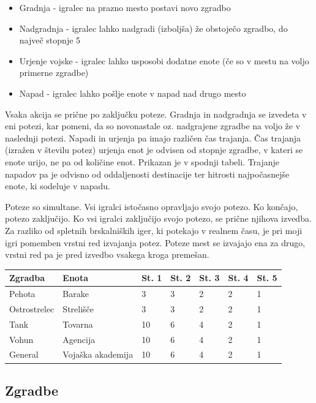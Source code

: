 \documentclass[a4paper, 16pt]{article}
\begin{document}
\begin{itemize}
    \item Gradnja - igralec na prazno mesto postavi novo zgradbo
    \item Nadgradnja - igralec lahko nadgradi (izboljša) že obstoječo zgradbo, do največ stopnje 5
    \item Urjenje vojske - igralec lahko usposobi dodatne enote (če so v mestu na voljo primerne zgradbe)
    \item Napad - igralec lahko pošlje enote v napad nad drugo mesto
\end{itemize}

Vsaka akcija se prične po zaključku poteze. Gradnja in nadgradnja se izvedeta v eni potezi, kar pomeni, da so novonastale oz. nadgrajene zgradbe na voljo že v naslednji potezi.
Napadi in urjenja pa imajo različen čas trajanja. Čas trajanja (izražen v številu potez) urjenja enot je odvisen od stopnje zgradbe, v kateri se enote urijo, ne pa od količine enot. Prikazan je v spodnji tabeli.
Trajanje napadov pa je odvisno od oddaljenosti destinacije ter hitrosti najpočasnejše enote, ki sodeluje v napadu.

Poteze so simultane. Vsi igralci istočasno opravljajo svojo potezo. Ko končajo, potezo zaključijo. Ko vsi igralci zaključijo svojo potezo, se prične njihova izvedba. Za razliko od spletnih brskalniških iger, ki potekajo
v realnem času, je pri moji igri pomemben vrstni red izvajanja potez. Poteze mest se izvajajo ena za drugo, vrstni red pa je pred izvedbo vsakega kroga premešan.


\begin{table}[]
    \begin{tabular}{ll|lllll}
    Zgradba      & Enota             & St. 1 & St. 2 & St. 3 & St. 4 & St. 5 \\ \hline
    Pehota       & Barake            & 3     & 3     & 2     & 2     & 1     \\
    Ostrostrelec & Strelišče         & 3     & 3     & 2     & 2     & 1     \\
    Tank         & Tovarna           & 10    & 6     & 4     & 2     & 1     \\
    Vohun        & Agencija          & 10    & 6     & 4     & 2     & 1     \\
    General      & Vojaška akademija & 10    & 6     & 4     & 2     & 1    
    \end{tabular}
\end{table}

\subsection{Zgradbe}
\end{document}
